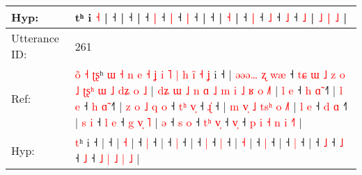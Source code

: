\documentclass[10pt]{article}
\DeclareRobustCommand{\hl}[1]{{\textcolor{red}{#1}}}
\begin{document}
\begin{longtable}{ll}
 \\
Hyp: & tʰ i \hl{}\hl{˧} |\hl{}\hl{}\hl{}\hl{} ˧\hl{}\hl{}\hl{}\hl{}\hl{}\hl{}\hl{}\hl{} |\hl{}\hl{}\hl{}\hl{} ˧\hl{}\hl{}\hl{}\hl{}\hl{}\hl{}\hl{} |\hl{}\hl{}\hl{}\hl{}\hl{} ˧\hl{}\hl{} \hl{|} ˧\hl{}\hl{} \hl{|} ˧\hl{}\hl{}\hl{}\hl{} \hl{|} ˧\hl{} |\hl{}\hl{}\hl{}\hl{} ˧\hl{}\hl{}\hl{}\hl{}\hl{}\hl{}\hl{}\hl{}\hl{}\hl{}\hl{}\hl{}\hl{}\hl{}\hl{}\hl{}\hl{}\hl{}\hl{}\hl{}\hl{}\hl{}\hl{}\hl{}\hl{}\hl{}\hl{}\hl{}\hl{}\hl{}\hl{}\hl{}\hl{}\hl{}\hl{}\hl{} |\hl{}\hl{}\hl{}\hl{}\hl{} \hl{˧} |\hl{}\hl{}\hl{}\hl{}\hl{} ˧\hl{}\hl{} \hl{|} ˧\hl{}\hl{} \hl{˩} ˧\hl{}\hl{}\hl{}\hl{}\hl{}\hl{}\hl{}\hl{}\hl{}\hl{} \hl{˩} ˧\hl{}\hl{}\hl{}\hl{} \hl{˩} |\hl{}\hl{}\hl{}\hl{}\hl{}\hl{}\hl{} \hl{˩} \hl{}\hl{|} \hl{˩} |
 \\
\midrule
Utterance ID: & 261 \\
Ref: & \hl{o}\hl{̃}\hl{ }\hl{˧}\hl{ }\hl{ʈ}\hl{ʂ}ʰ\hl{ }\hl{ɯ}\hl{ }\hl{˧}\hl{ }\hl{n}\hl{ }\hl{e}\hl{ }\hl{˧}\hl{ }\hl{ʝ}\hl{ }\hl{i}\hl{ }\hl{˥}\hl{ }\hl{|}\hl{ }\hl{h}\hl{ }\hl{i}\hl{̃}\hl{ }\hl{˧}\hl{ }\hl{ʝ} i ˧ |\hl{ }\hl{ə}\hl{ə}\hl{ə}\hl{…}\hl{ }\hl{ʐ}\hl{ }\hl{w}\hl{æ} ˧\hl{ }\hl{t}\hl{ɕ}\hl{ }\hl{ɯ}\hl{ }\hl{˩}\hl{ }\hl{z}\hl{ }\hl{o}\hl{ }\hl{˩}\hl{ }\hl{ʈ}\hl{ʂ}\hl{ʰ}\hl{ }\hl{ɯ}\hl{ }\hl{˩}\hl{ }\hl{d}\hl{ʑ}\hl{ }\hl{o}\hl{ }\hl{˩} |\hl{ }\hl{d}\hl{ʑ}\hl{ }\hl{ɯ}\hl{ }\hl{˩}\hl{ }\hl{n}\hl{ }\hl{ɑ}\hl{ }\hl{˩}\hl{ }\hl{m}\hl{ }\hl{i}\hl{ }\hl{˩}\hl{ }\hl{ʁ}\hl{ }\hl{o} \hl{˩}\hl{˥} |\hl{ }\hl{l}\hl{ }\hl{e} ˧\hl{ }\hl{h} \hl{ɑ}\hl{̃} ˧\hl{˥} |\hl{ }\hl{l}\hl{ }\hl{e} ˧\hl{ }\hl{h} \hl{ɑ}\hl{̃} ˧\hl{˥} |\hl{ }\hl{z}\hl{ }\hl{o}\hl{ }\hl{˩}\hl{ }\hl{q}\hl{ }\hl{o} ˧\hl{ }\hl{t}\hl{ʰ} \hl{v}\hl{̩} ˧ \hl{ɻ}\hl{̍} ˧ |\hl{ }\hl{m}\hl{ }\hl{v}\hl{̩}\hl{ }\hl{˩}\hl{ }\hl{t}\hl{s}\hl{ʰ}\hl{ }\hl{o} \hl{˩}\hl{˥} |\hl{ }\hl{l}\hl{ }\hl{e} ˧\hl{ }\hl{d} \hl{ɑ} ˧\hl{˥} |\hl{ }\hl{s}\hl{ }\hl{i} ˧\hl{ }\hl{l} \hl{e} ˧\hl{ }\hl{g}\hl{ }\hl{v}\hl{̩}\hl{ }\hl{˥} |\hl{ }\hl{ə} ˧\hl{ }\hl{s} \hl{o} ˧\hl{ }\hl{t}\hl{ʰ} \hl{v}\hl{̩} ˧ \hl{v}\hl{̩} ˧\hl{ }\hl{p} \hl{i} \hl{˧} \hl{n} \hl{i} \hl{˧}\hl{˥} |
 \\
Hyp: & \hl{}\hl{}\hl{}\hl{}\hl{}\hl{}\hl{t}ʰ\hl{}\hl{}\hl{}\hl{}\hl{}\hl{}\hl{}\hl{}\hl{}\hl{}\hl{}\hl{}\hl{}\hl{}\hl{}\hl{}\hl{}\hl{}\hl{}\hl{}\hl{}\hl{}\hl{}\hl{}\hl{}\hl{}\hl{} i ˧ |\hl{}\hl{}\hl{}\hl{}\hl{}\hl{}\hl{}\hl{}\hl{}\hl{} ˧\hl{}\hl{}\hl{}\hl{}\hl{}\hl{}\hl{}\hl{}\hl{}\hl{}\hl{}\hl{}\hl{}\hl{}\hl{}\hl{}\hl{}\hl{}\hl{}\hl{}\hl{}\hl{}\hl{}\hl{}\hl{}\hl{}\hl{}\hl{} |\hl{}\hl{}\hl{}\hl{}\hl{}\hl{}\hl{}\hl{}\hl{}\hl{}\hl{}\hl{}\hl{}\hl{}\hl{}\hl{}\hl{}\hl{}\hl{}\hl{}\hl{}\hl{}\hl{} \hl{}\hl{˧} |\hl{}\hl{}\hl{}\hl{} ˧\hl{}\hl{} \hl{}\hl{|} ˧\hl{} |\hl{}\hl{}\hl{}\hl{} ˧\hl{}\hl{} \hl{}\hl{|} ˧\hl{} |\hl{}\hl{}\hl{}\hl{}\hl{}\hl{}\hl{}\hl{}\hl{}\hl{} ˧\hl{}\hl{}\hl{} \hl{}\hl{|} ˧ \hl{}\hl{|} ˧ |\hl{}\hl{}\hl{}\hl{}\hl{}\hl{}\hl{}\hl{}\hl{}\hl{}\hl{}\hl{}\hl{} \hl{}\hl{˧} |\hl{}\hl{}\hl{}\hl{} ˧\hl{}\hl{} \hl{|} ˧\hl{} |\hl{}\hl{}\hl{}\hl{} ˧\hl{}\hl{} \hl{|} ˧\hl{}\hl{}\hl{}\hl{}\hl{}\hl{}\hl{} |\hl{}\hl{} ˧\hl{}\hl{} \hl{˩} ˧\hl{}\hl{}\hl{} \hl{}\hl{˩} ˧ \hl{}\hl{˩} ˧\hl{}\hl{} \hl{˩} \hl{|} \hl{˩} \hl{|} \hl{}\hl{˩} |

\end{longtable}
\end{document}
